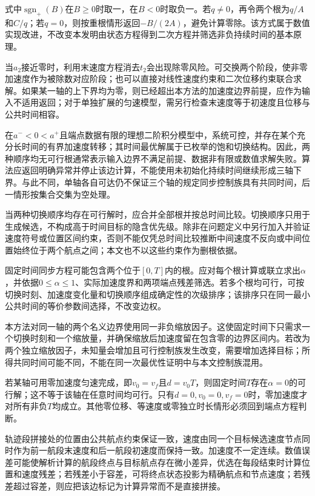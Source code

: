 \documentclass[UTF8,a4paper,12pt,fontset=fandol]{ctexart}
\begin{document}
式中\(\operatorname{sgn}_{+}(B)\)在\(B\ge0\)时取一，在\(B<0\)时取负一。若\(q\ne0\)，再令两个根为\(q/A\)和\(C/q\)；若\(q=0\)，则按重根情形返回\(-B/(2A)\)，避免计算零除。该方式属于数值实现改进，不改变本发明由状态方程得到二次方程并筛选非负持续时间的基本原理。

当\(a_2\)接近零时，利用末速度方程消去\(t_2\)会出现除零风险。可交换两个阶段，使非零加速度作为被除数对应阶段；也可以直接对线性速度约束和二次位移约束联合求解。如果某一轴的上下界均为零，则已经超出本方法的加速度边界前提，应作为输入不适用返回；对于单独扩展的匀速模型，需另行检查末速度等于初速度且位移与公共时间相容。

在\(a^-<0<a^+\)且端点数据有限的理想二阶积分模型中，系统可控，并存在某个充分长时间的有界加速度转移；其时间最优解属于已枚举的饱和切换结构。因此，两种顺序均无可行根通常表示输入边界不满足前提、数据非有限或数值求解失败。算法应返回明确异常并停止该边计算，不能使用未初始化持续时间继续形成三轴下界。与此不同，单轴各自可达仍不保证三个轴的规定同步控制族具有共同时间，后一情形按集合交集为空处理。

当两种切换顺序均存在可行解时，应合并全部根并按总时间比较。切换顺序只用于生成候选，不构成高于时间目标的隐含优先级。除非在问题定义中另行加入并验证速度符号或位置区间约束，否则不能仅凭总时间比较推断中间速度不反向或中间位置始终位于两个航点之间；本文也不以这些约束作为删根依据。

固定时间同步方程可能包含两个位于\([0,T]\)内的根。应对每个根计算或联立求出\(\alpha\)，并依据\(0\le\alpha\le1\)、实际加速度界和两项端点残差筛选。若多个根均可行，可按切换时刻、加速度变化量和切换顺序组成确定性的次级排序；该排序只在同一最小公共时间的等价参数间选择，不改变边权。

本方法对同一轴的两个名义边界使用同一非负缩放因子。这使固定时间下只需求一个切换时刻和一个缩放量，并确保缩放后加速度留在包含零的边界区间内。若改为两个独立缩放因子，未知量会增加且可行控制族发生改变，需要增加选择目标；所得共同时间可能不同，不能在同一次最优性证明中与本文控制族混用。

若某轴可用零加速度匀速完成，即\(v_0=v_f\)且\(d=v_0T\)，则固定时间\(T\)存在\(\alpha=0\)的可行解；这不等于该轴在任意时间均可行。只有\(d=0,v_0=0,v_f=0\)时，零加速度才对所有非负\(T\)均成立。其他零位移、等速度或零独立时长情形必须回到端点方程判断。

轨迹段拼接处的位置由公共航点约束保证一致，速度由同一个目标候选速度节点同时作为前一航段末速度和后一航段初速度而保持一致。加速度不一定连续。数值误差可能使解析计算的航段终点与目标航点存在微小差异，优选在每段结束时计算位置和速度残差；若残差小于容差，可将终点状态投影为精确航点和节点速度；若残差超过容差，则应把该边标记为计算异常而不是直接拼接。
\end{document}
